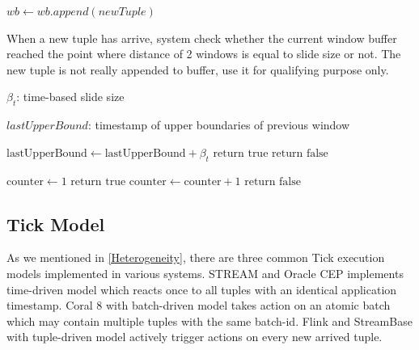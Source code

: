 \begin{algorithm}
\begin{algorithmic}[1]
   	\State $wb \gets wb.append(newTuple)$ 
    
    
    \EndProcedure
  \end{algorithmic}
  




\end{algorithm}


\begin{algorithm}
\caption{Whether system should trigger a new window }
\label{algorithm:notifyTrigger}
When a new tuple has arrive, system check whether the current window buffer reached the point where distance of 2 windows is equal to slide size or not. The new tuple is not really appended to buffer, use it for qualifying purpose only.

\algrenewcommand{}
\begin{algorithmic}[1]
  	
  			{$\beta_t$: time-based slide size }

  			{$lastUpperBound$: timestamp of upper boundaries of previous window}
    
   
    
    			\State $\textrm{lastUpperBound} \gets \textrm{lastUpperBound} + \beta_t$
    			\State $\textrm{return true}$
    		\Else
    			\State$\textrm{return false}$
    		\EndIf
    
    \Else {}
    			\State $\textrm{counter} \gets 1$
    			\State $\textrm{return true}$
    		\Else
    			\State $\textrm{counter} \gets \textrm{counter} + 1$
    			\State $\textrm{return false}$
    		\EndIf
    	\EndIf
    
    
    \EndProcedure
  \end{algorithmic}
\end{algorithm}


\subsection{Tick Model}
As we mentioned in \ref{Heterogeneity}, there are three common Tick execution models\citep{Dindar:2013} implemented in various systems. STREAM and Oracle CEP implements time-driven model which reacts once to all tuples with an identical application timestamp. Coral 8 with batch-driven model takes action on an atomic batch which may contain multiple tuples with the same batch-id. Flink and StreamBase with tuple-driven model actively trigger actions on every new arrived tuple.

